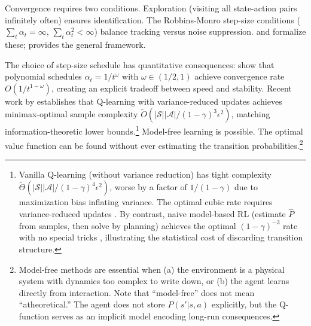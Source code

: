 Convergence requires two conditions. Exploration (visiting all state-action pairs infinitely often) ensures identification. The Robbins-Monro step-size conditions ($\sum_t \alpha_t = \infty$, $\sum_t \alpha_t^2 < \infty$) balance tracking versus noise suppression. \citet{WatkinsDayan1992} and \citet{jaakkola1994} formalize these; \citet{tsitsiklis1994} provides the general framework.

The choice of step-size schedule has quantitative consequences: \citet{evendar2003} show that polynomial schedules $\alpha_t = 1/t^\omega$ with $\omega \in (1/2, 1)$ achieve convergence rate $O(1/t^{1-\omega})$, creating an explicit tradeoff between speed and stability. Recent work by \citet{li2024minimax} establishes that Q-learning with variance-reduced updates achieves minimax-optimal sample complexity $\tilde{O}(|\mathcal{S}||\mathcal{A}|/(1-\gamma)^3\epsilon^2)$, matching information-theoretic lower bounds.\footnote{Vanilla Q-learning (without variance reduction) has tight complexity $\tilde{\Theta}(|\mathcal{S}||\mathcal{A}|/(1-\gamma)^4\epsilon^2)$, worse by a factor of $1/(1-\gamma)$ due to maximization bias inflating variance. The optimal cubic rate requires variance-reduced updates \citep{wainwright2019,sidford2018}. By contrast, naive model-based RL (estimate $\hat{P}$ from samples, then solve by planning) achieves the optimal $(1-\gamma)^{-3}$ rate with no special tricks \citep{agarwal2020}, illustrating the statistical cost of discarding transition structure.} Model-free learning is possible. The optimal value function can be found without ever estimating the transition probabilities.\footnote{Model-free methods are essential when (a) the environment is a physical system with dynamics too complex to write down, or (b) the agent learns directly from interaction. Note that ``model-free'' does not mean ``atheoretical.'' The agent does not store $P(s'|s,a)$ explicitly, but the Q-function serves as an implicit model encoding long-run consequences.}

